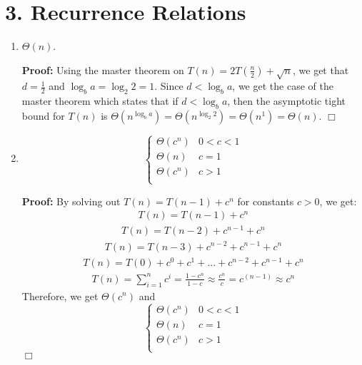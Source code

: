\documentclass[11pt]{article}
\def\endproofmark{$\Box$}
\newenvironment{proof}{\par{\bf Proof:}}{\endproofmark\smallskip}
\begin{document}
\newpage
\section*{3. Recurrence Relations}
\begin{enumerate}[label=(\alph*)]
\item
$\Theta(n)$.
\begin{proof}
Using the master theorem on $T(n) = 2T(\frac{n} {2}) + \sqrt{n}$, we get that $d = \frac{1} {2}$ and $\log_b{a} = \log_2{2} = 1$. Since $d < \log_b{a}$, we get the case of the master theorem which states that if $d < \log_b{a}$, then the asymptotic tight bound for $T(n)$ is $\Theta(n^{\log_b{a}}) = \Theta(n^{\log_2{2}}) = \Theta(n^1) = \Theta(n)$.
\end{proof}

\item
\[   \left\{
\begin{array}{ll}
	\Theta(c^n) & 0 < c < 1 \\
    \Theta(n) & c = 1 \\
    \Theta(c^n) & c > 1 \\
\end{array} 
\right. \]
\begin{proof}
By solving out $T(n) = T(n - 1) + c^n$ for constants $c > 0$, we get: \\
\begin{align*}
T(n) = T(n - 1) + c^n
\end{align*}
\begin{align*}
T(n) = T(n - 2) + c^{n - 1} + c^n
\end{align*}
\begin{align*}
T(n) = T(n - 3) + c^{n - 2} + c^{n - 1} + c^n
\end{align*}
\begin{align*}
T(n) = T(0) + c^0 + c^1 + ... + c^{n - 2} + c^{n - 1} + c^n
\end{align*}
\begin{align*}
T(n) = \sum_{i = 1}^{n} c^i = \frac{1 - c^n} {1 - c} \approx \frac{c^n} {c} = c^{(n - 1)} \approx c^n
\end{align*}
Therefore, we get $\Theta(c^n)$ and \\
\[   \left\{
\begin{array}{ll}
	\Theta(c^n) & 0 < c < 1 \\
    \Theta(n) & c = 1 \\
    \Theta(c^n) & c > 1 \\
\end{array} 
\right. \]
\end{proof}


\end{enumerate}
\end{document}
